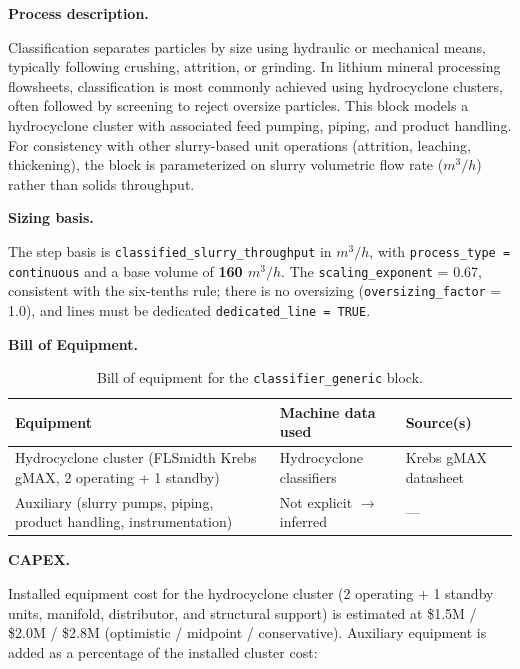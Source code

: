 \medskip
\noindent\textbf{Process description.}\quad

Classification separates particles by size using hydraulic or mechanical means, typically following crushing, attrition, or grinding. In lithium mineral processing flowsheets, classification is most commonly achieved using hydrocyclone clusters, often followed by screening to reject oversize particles. This block models a hydrocyclone cluster with associated feed pumping, piping, and product handling. For consistency with other slurry-based unit operations (attrition, leaching, thickening), the block is parameterized on slurry volumetric flow rate ($\si{m^3/h}$) rather than solids throughput.


\medskip
\noindent\textbf{Sizing basis.}\quad

The step basis is \texttt{classified\_slurry\_throughput} in $\si{m^3/h}$, with \texttt{process\_type = continuous} and a base volume of \textbf{160 $\si{m^3/h}$}. The \texttt{scaling\_exponent} = 0.67, consistent with the six-tenths rule; there is no oversizing (\texttt{oversizing\_factor} = 1.0), and lines must be dedicated \texttt{dedicated\_line = TRUE}.

\medskip
\noindent\textbf{Bill of Equipment.}\quad

\begin{table}[h!]
\caption{Bill of equipment for the \texttt{classifier\_generic} block.}
\centering
\begin{tabular}{>{\raggedright\arraybackslash}p{5.2cm}
				>{\raggedright\arraybackslash}p{4cm}
				>{\raggedright\arraybackslash}p{4.5cm}}
\toprule
\textbf{Equipment} & \textbf{Machine data used} & \textbf{Source(s)} \\
\midrule
Hydrocyclone cluster (FLSmidth Krebs gMAX, 2 operating + 1 standby) & Hydrocyclone classifiers & Krebs gMAX datasheet \\
Auxiliary (slurry pumps, piping, product handling, instrumentation) & Not explicit $\rightarrow$ inferred & --- \\
\bottomrule
\end{tabular}
\end{table}


\medskip
\noindent\textbf{CAPEX.}\quad

Installed equipment cost for the hydrocyclone cluster (2 operating + 1 standby units, manifold, distributor, and structural support) is estimated at \$1.5M / \$2.0M / \$2.8M (optimistic / midpoint / conservative). Auxiliary equipment is added as a percentage of the installed cluster cost:

